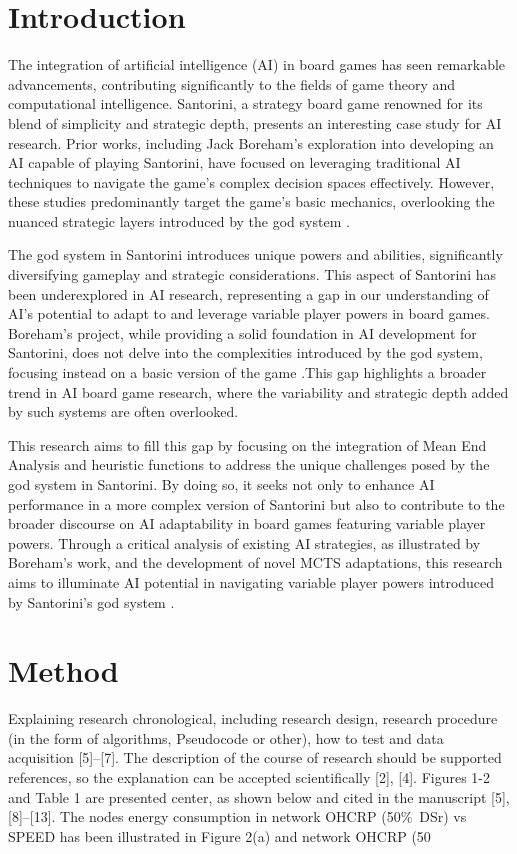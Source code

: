 \documentclass{telkomnika}
\begin{document}

\section{Introduction}
\label{}
The integration of artificial intelligence (AI) in board games has seen remarkable advancements, contributing significantly to the fields of game theory and computational intelligence. Santorini, a strategy board game renowned for its blend of simplicity and strategic depth, presents an interesting case study for AI research. Prior works, including Jack Boreham's exploration into developing an AI capable of playing Santorini, have focused on leveraging traditional AI techniques to navigate the game's complex decision spaces effectively. However, these studies predominantly target the game's basic mechanics, overlooking the nuanced strategic layers introduced by the god system \cite{Boreham2019}.

The god system in Santorini introduces unique powers and abilities, significantly diversifying gameplay and strategic considerations. This aspect of Santorini has been underexplored in AI research, representing a gap in our understanding of AI's potential to adapt to and leverage variable player powers in board games. Boreham's project, while providing a solid foundation in AI development for Santorini, does not delve into the complexities introduced by the god system, focusing instead on a basic version of the game \cite{Boreham2019}.This gap highlights a broader trend in AI board game research, where the variability and strategic depth added by such systems are often overlooked.

This research aims to fill this gap by focusing on the integration of Mean End Analysis and heuristic functions to address the unique challenges posed by the god system in Santorini. By doing so, it seeks not only to enhance AI performance in a more complex version of Santorini but also to contribute to the broader discourse on AI adaptability in board games featuring variable player powers. Through a critical analysis of existing AI strategies, as illustrated by Boreham's work, and the development of novel MCTS adaptations, this research aims to illuminate AI potential in navigating variable player powers introduced by Santorini's god system \cite{Boreham2019}.



\section{Method}
\label{}
Explaining research chronological, including research design, research procedure (in the form of algorithms, Pseudocode or other), how to test and data acquisition [5]–[7]. The description of the course of research should be supported references, so the explanation can be accepted scientifically [2], [4]. Figures 1-2 and Table 1 are presented center, as shown below and cited in the manuscript [5], [8]–[13]. The nodes energy consumption in network OHCRP (50\%\ DSr) vs SPEED has been illustrated in Figure 2(a) and network OHCRP (50%
\end{document}
